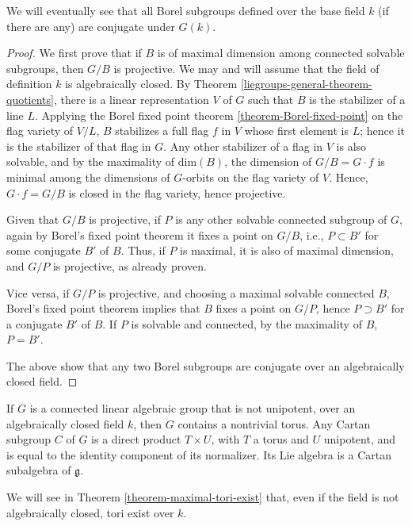 We will eventually see that all Borel subgroups defined over the base field $k$ (if there are any) are conjugate under $G(k)$.

\begin{proof}
 

 We first prove that if $B$ is of maximal dimension among connected solvable subgroups, then $G/B$ is projective. We may and will assume that the field of definition $k$ is algebraically closed. By Theorem \ref{liegroups-general-theorem-quotients}, there is a linear representation $V$ of $G$ such that $B$ is the stabilizer of a line $L$. Applying the Borel fixed point theorem \ref{theorem-Borel-fixed-point} on the flag variety of $V/L$, $B$ stabilizes a full flag $f$ in $V$ whose first element is $L$; hence it is the stabilizer of that flag in $G$. Any other stabilizer of a flag in $V$ is also solvable, and by the maximality of $\text{dim}(B)$, the dimension of $G/B = G\cdot f$ is minimal among the dimensions of $G$-orbits on the flag variety of $V$. Hence, $G\cdot f = G/B$ is closed in the flag variety, hence projective. 
 
 Given that $G/B$ is projective, if $P$ is any other solvable connected subgroup of $G$, again by Borel's fixed point theorem it fixes a point on $G/B$, i.e., $P\subset B'$ for some conjugate $B'$ of $B$. Thus, if $P$ is maximal, it is also of maximal dimension, and $G/P$ is projective, as already proven. 
 
 
 Vice versa, if $G/P$ is projective, and choosing a maximal solvable connected $B$, Borel's fixed point theorem implies that $B$ fixes a point on $G/P$, hence $P\supset B'$ for a conjugate $B'$ of $B$. If $P$ is solvable and connected, by the maximality of $B$, $P=B'$.
 
 The above show that any two Borel subgroups are conjugate over an algebraically closed field. 
\end{proof}

\begin{proposition}
\label{proposition-unipotent-torus}
If $G$ is a connected linear algebraic group that is not unipotent, over an algebraically closed field $k$, then $G$ contains a nontrivial torus. Any Cartan subgroup $C$ of $G$ is a direct product $T\times U$, with $T$ a torus and $U$ unipotent, and is equal to the identity component of its normalizer. Its Lie algebra is a Cartan subalgebra of $\mathfrak g$.
\end{proposition}

We will see in Theorem \ref{theorem-maximal-tori-exist} that, even if the field is not algebraically closed, tori exist over $k$.


